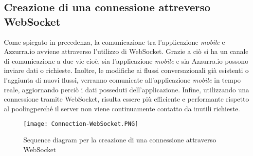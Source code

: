 \subsection{Creazione di una connessione attreverso WebSocket}
Come spiegato in precedenza, la comunicazione tra l'applicazione \emph{mobile} e Azzurra.io avviene attraverso l'utilizzo di \gls{WebSocket}\ap{[g]}. Grazie a ciò si ha un canale di comunicazione a due vie cioè, sia l'applicazione \emph{mobile} e sia Azzurra.io possono inviare dati o richieste. Inoltre, le modifiche ai flussi conversazionali già esistenti o l'aggiunta di nuovi flussi, verranno comunicate all'applicazione \emph{mobile} in tempo reale, aggiornando perciò i dati posseduti dell'applicazione. Infine, utilizzando una connessione tramite \gls{WebSocket}\ap{[g]}, risulta essere più efficiente e performante rispetto al \gls{pooling}\glsfirstoccur perché il \gls{server}\ap{[g]} non viene continuamente contatto da inutili richieste.
\begin{figure}[h]
	\begin{center}
		\texttt{[image: Connection-WebSocket.PNG]}
		\caption{Sequence diagram per la creazione di una connessione attraverso WebSocket}\label{fig:websocket}
	\end{center}
\end{figure}

